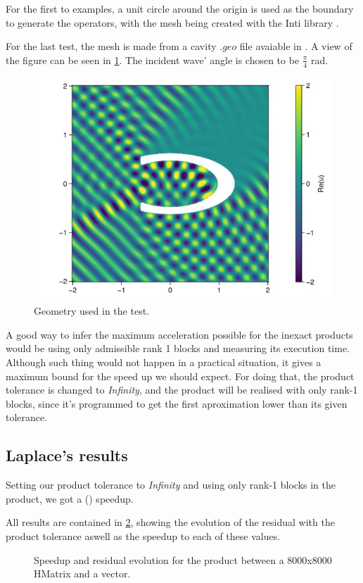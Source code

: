 For the first to examples, a unit circle around the origin is used as the boundary to generate the operators, with the mesh being created with the Inti library \cite{git-inti}.

For the last test, the mesh is made from a cavity $.geo$ file avaiable in \cite{git_dudu}. A view of the figure can be seen in \ref{fig:cavity_fig}. The incident wave' angle is chosen to be $\frac{\pi}{4}$ rad.

\begin{figure}[h!]
    \centering
    \includegraphics[width=0.6\linewidth]{images/cavity_fig.jpg}
    \caption{Geometry used in the test.}
    \label{fig:cavity_fig}
\end{figure}

A good way to infer the maximum acceleration possible for the inexact products would be using only admissible rank 1 blocks and measuring its execution time. Although such thing would not happen in a practical situation, it gives a maximum bound for the speed up we should expect.
For doing that, the product tolerance is changed to \textit{Infinity}, and the product will be realised with only rank-1 blocks, since it's programmed to get the first aproximation lower than its given tolerance.

\subsection{Laplace's results}

Setting our product tolerance to \textit{Infinity} and using only rank-1 blocks in the product, we got a () speedup.

All results are contained in \ref{fig:laplace_results}, showing the evolution of the residual with the product tolerance aswell as the speedup to each of these values.

\begin{figure}[h!]
    \centering
    
    \caption{Speedup and residual evolution for the product between a 8000x8000 HMatrix and a vector.}
    \label{fig:laplace_results}
\end{figure}

